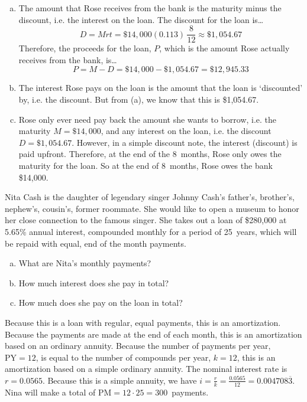 \documentclass[12pt,letterpaper]{exam}
\begin{document}
\begin{questions}
\begin{enumerate}[(a)]
\item The amount that Rose receives from the bank is the maturity minus the discount, i.e. the interest on the loan. The discount for the loan is\dots
	\[
	D= Mrt= \$14,\!000(0.113) \, \frac{8}{12} \approx \$1,\!054.67
	\]
Therefore, the proceeds for the loan, $P$, which is the amount Rose actually receives from the bank, is\dots
	\[
	P= M - D= \$14,\!000 - \$1,\!054.67= \$12,\!945.33
	\] \pspace

\item The interest Rose pays on the loan is the amount that the loan is `discounted' by, i.e. the discount. But from (a), we know that this is \$1,054.67. \pspace

\item Rose only ever need pay back the amount she wants to borrow, i.e. the maturity $M= \$14,\!000$, and any interest on the loan, i.e. the discount $D= \$1,\!054.67$. However, in a simple discount note, the interest (discount) is paid upfront. Therefore, at the end of the 8~months, Rose only owes the maturity for the loan. So at the end of 8~months, Rose owes the bank \$14,000. 
\end{enumerate}



\newpage
\question[15] Nita Cash is the daughter of legendary singer Johnny Cash's father's, brother's, nephew's, cousin's, former roommate. She would like to open a museum to honor her close connection to the famous singer. She takes out a loan of \$280,000 at 5.65\% annual interest, compounded monthly for a period of 25~years, which will be repaid with equal, end of the month payments. 
	\begin{enumerate}[(a)]
	\item What are Nita's monthly payments?
	\item How much interest does she pay in total?
	\item How much does she pay on the loan in total?
	\end{enumerate} \pspace

\sol Because this is a loan with regular, equal payments, this is an amortization. Because the payments are made at the end of each month, this is an amortization based on an ordinary annuity. Because the number of payments per year, $\text{PY}= 12$, is equal to the number of compounds per year, $k= 12$, this is an amortization based on a simple ordinary annuity. The nominal interest rate is $r= 0.0565$. Because this is a simple annuity, we have $i= \frac{r}{k}= \frac{0.0565}{12}= 0.004708 \overline{3}$. Nina will make a total of $\text{PM}= 12 \cdot 25= 300$~payments. 


\end{questions}
\end{document}
